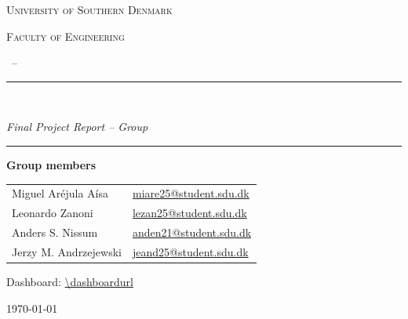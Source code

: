 \begin{titlepage}
\centering

\vspace*{1.5cm}


{\large\scshape University of Southern Denmark\par}
{\large\scshape Faculty of Engineering\par}

\vspace{0.6cm}
{\large \coursename~--~\semester\par}

\vspace{2.2cm}
\rule{\textwidth}{0.6pt}\\[0.6cm]
{\Huge\bfseries \projecttitle \par}
\vspace{0.4cm}
{\large\itshape Final Project Report -- Group \groupnumber \par}
\rule{\textwidth}{0.6pt}

\vspace{2.0cm}

{\large\bfseries Group members\par}
\vspace{0.4cm}
\begin{tabular}{ll}
Miguel Aréjula Aísa & \href{mailto:miare25@student.sdu.dk}{miare25@student.sdu.dk} \\[4pt]
Leonardo Zanoni         & \href{mailto:lezan25@student.sdu.dk}{lezan25@student.sdu.dk} \\[4pt]
Anders S. Nissum        & \href{mailto:anden21@student.sdu.dk}{anden21@student.sdu.dk} \\[4pt]
Jerzy M. Andrzejewski         & \href{mailto:jeand25@student.sdu.dk}{jeand25@student.sdu.dk} \\
\end{tabular}

\vfill

{\large Dashboard: \url{\dashboardurl}\par}
\vspace{0.6cm}
{\large \today\par}

\end{titlepage}
